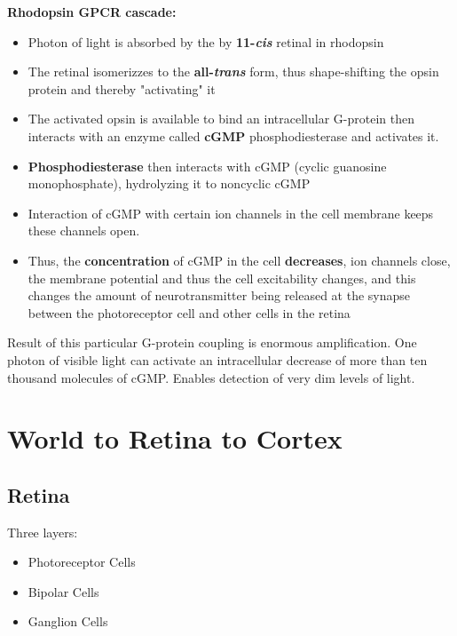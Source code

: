 \documentclass{article}
\begin{document}
\noindent \textbf{Rhodopsin GPCR cascade:}
\begin{itemize}
    \item Photon of light is absorbed by the by \textbf{11-\textit{cis}} retinal in rhodopsin
    \item The retinal isomerizzes to the \textbf{all-\textit{trans}} form, thus shape-shifting the opsin protein and thereby "activating" it
    \item The activated opsin is available to bind an intracellular G-protein then interacts with an enzyme called \textbf{cGMP} phosphodiesterase and activates it. 
    \item \textbf{Phosphodiesterase} then interacts with cGMP (cyclic guanosine monophosphate), hydrolyzing it to noncyclic cGMP
    \item Interaction of cGMP with certain ion channels in the cell membrane keeps these channels open. 
    \item Thus, the \textbf{concentration} of cGMP in the cell \textbf{decreases}, ion channels close, the membrane potential and thus the cell excitability changes, and this changes the amount of neurotransmitter being released at the synapse between the photoreceptor cell and other cells in the retina
\end{itemize}

Result of this particular G-protein coupling is enormous amplification. One photon of visible light can activate an intracellular decrease of more than ten thousand molecules of cGMP. Enables detection of very dim levels of light. \\


\newpage
\section{World to Retina to Cortex}
\subsection{Retina}
Three layers: 
\begin{itemize}
    \item Photoreceptor Cells
    \item Bipolar Cells
    \item Ganglion Cells
\end{itemize}
\end{document}
